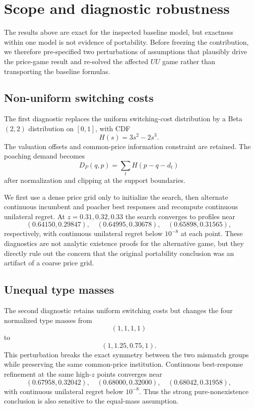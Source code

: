 \section{Scope and diagnostic robustness}\label{sec:scope}

The results above are exact for the inspected baseline model, but exactness within one model is not evidence of portability.  Before freezing the contribution, we therefore pre-specified two perturbations of assumptions that plausibly drive the price-game result and re-solved the affected \(UU\) game rather than transporting the baseline formulas.

\subsection{Non-uniform switching costs}

The first diagnostic replaces the uniform switching-cost distribution by a Beta\((2,2)\) distribution on \([0,1]\), with CDF
\[
H(s)=3s^2-2s^3.
\]
The valuation offsets and common-price information constraint are retained.  The poaching demand becomes
\[
D_P(q,p)=\sum_t H(p-q-d_t)
\]
after normalization and clipping at the support boundaries.

We first use a dense price grid only to initialize the search, then alternate continuous incumbent and poacher best responses and recompute continuous unilateral regret.  At \(z=0.31,0.32,0.33\) the search converges to profiles near
\[
(0.64150,0.29847),\quad
(0.64995,0.30678),\quad
(0.65898,0.31565),
\]
respectively, with continuous unilateral regret below \(10^{-8}\) at each point.  These diagnostics are not analytic existence proofs for the alternative game, but they directly rule out the concern that the original portability conclusion was an artifact of a coarse price grid.

\subsection{Unequal type masses}

The second diagnostic retains uniform switching costs but changes the four normalized type masses from
\[
(1,1,1,1)
\]
to
\[
(1,1.25,0.75,1).
\]
This perturbation breaks the exact symmetry between the two mismatch groups while preserving the same common-price institution.  Continuous best-response refinement at the same high-\(z\) points converges near
\[
(0.67958,0.32042),\quad
(0.68000,0.32000),\quad
(0.68042,0.31958),
\]
with continuous unilateral regret below \(10^{-8}\).  Thus the strong pure-nonexistence conclusion is also sensitive to the equal-mass assumption.

